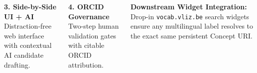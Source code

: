 \documentclass[
  25pt,
  a0paper,
  portrait,
  margin=0mm,
  innermargin=15mm,
  blockverticalspace=7mm,
  colspace=10mm,
  subcolspace=8mm
]{tikzposter}
\begin{document}
\begin{columns}
{    \vspace{0.14cm}
    \noindent
    \begin{minipage}{0.488\linewidth}
      \begin{tcolorbox}[colback=vlizHeroBg,colframe=vlizBorder,arc=3.5mm,boxrule=1.4pt,left=4mm,right=4mm,top=2.2mm,bottom=2.2mm,height=4.8cm]
        {\color{vlizNavy}\bfseries 3. Side-by-Side UI + AI}\\[2pt]
        {\footnotesize Distraction-free web interface with contextual AI candidate drafting.}
      \end{tcolorbox}
    \end{minipage}\hfill
    \begin{minipage}{0.488\linewidth}
      \begin{tcolorbox}[colback=vlizHeroBg,colframe=vlizBorder,arc=3.5mm,boxrule=1.4pt,left=4mm,right=4mm,top=2.2mm,bottom=2.2mm,height=4.8cm]
        {\color{vlizNavy}\bfseries 4. ORCID Governance}\\[2pt]
        {\footnotesize Two-step human validation gates with citable ORCID attribution.}
      \end{tcolorbox}
    \end{minipage}

    \vspace{0.14cm}
    \begin{tcolorbox}[colback=vlizLightTeal,colframe=vlizTeal,arc=4mm,boxrule=1.5pt,left=5mm,right=5mm,top=2.5mm,bottom=2.5mm]
      {\color{vlizNavy}\bfseries Downstream Widget Integration:} {\small Drop-in \texttt{vocab.vliz.be} search widgets ensure any multilingual label resolves to the exact same persistent Concept URI.}
    \end{tcolorbox}
    \vspace*{1.5mm}
  }


\end{columns}
\end{document}
